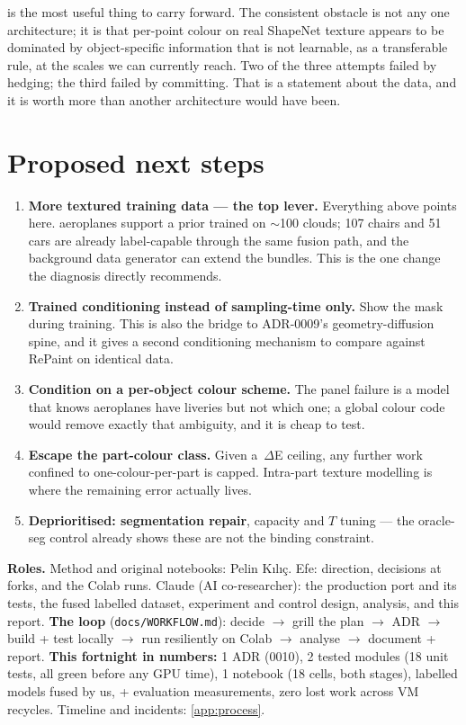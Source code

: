 \documentclass[11pt]{article}
\begin{document}
 is the most useful thing to carry forward. The consistent obstacle is
not any one architecture; it is that per-point colour on real ShapeNet texture appears to be
dominated by object-specific information that is not learnable, as a transferable rule, at the
scales we can currently reach. Two of the three attempts failed by hedging; the third failed by
committing. That is a statement about the data, and it is worth more than another architecture
would have been.

\section{Proposed next steps}\label{sec:next}

\begin{enumerate}
  \item \textbf{More textured training data --- the top lever.} Everything above points here.
  \nLabeled{} aeroplanes support a prior trained on $\sim$100 clouds; 107 chairs and 51 cars
  are already label-capable through the same fusion path, and the background data generator can
  extend the bundles. This is the one change the diagnosis directly recommends.
  \item \textbf{Trained conditioning instead of sampling-time only.} Show the mask during
  training. This is also the bridge to ADR-0009's geometry-diffusion spine, and it gives a
  second conditioning mechanism to compare against RePaint on identical data.
  \item \textbf{Condition on a per-object colour scheme.} The panel failure is a model that
  knows aeroplanes have liveries but not which one; a global colour code would remove exactly
  that ambiguity, and it is cheap to test.
  \item \textbf{Escape the part-colour class.} Given a \hdrmR\,$\Delta$E ceiling, any further
  work confined to one-colour-per-part is capped. Intra-part texture modelling is where the
  remaining error actually lives.
  \item \textbf{Deprioritised: segmentation repair}, capacity and $T$ tuning --- the oracle-seg
  control already shows these are not the binding constraint.
\end{enumerate}

\begin{processbox}
\textbf{Roles.} Method and original notebooks: Pelin K\i l\i\c{c}. Efe: direction, decisions at
forks, and the Colab runs. Claude (AI co-researcher): the production port and its tests, the
fused labelled dataset, experiment and control design, analysis, and this report.
\textbf{The loop} (\texttt{docs/WORKFLOW.md}): decide $\rightarrow$ grill the plan $\rightarrow$
ADR $\rightarrow$ build + test locally $\rightarrow$ run resiliently on Colab $\rightarrow$
analyse $\rightarrow$ document + report. \textbf{This fortnight in numbers:} 1 ADR (0010),
2 tested modules (18 unit tests, all green before any GPU time), 1 notebook (18 cells, both
stages), \nLabeled{} labelled models fused by us, \nrowsS{} + \nrowsR{} evaluation measurements,
zero lost work across VM recycles. Timeline and incidents: \cref{app:process}.
\end{processbox}
\end{document}
